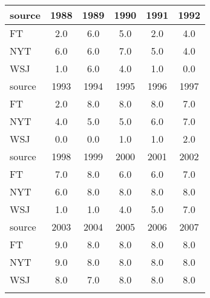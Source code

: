 \begin{tabular}{lccccc}
\hline\hline 
\addlinespace 
source & 1988 & 1989 & 1990 & 1991 & 1992 \\ 
\hline 
FT & 2.0 & 6.0 & 5.0 & 2.0 & 4.0 \\
NYT & 6.0 & 6.0 & 7.0 & 5.0 & 4.0 \\
WSJ & 1.0 & 6.0 & 4.0 & 1.0 & 0.0 \\
\hline 
\addlinespace 
source & 1993 & 1994 & 1995 & 1996 & 1997 \\ 
\hline 
FT & 2.0 & 8.0 & 8.0 & 8.0 & 7.0 \\
NYT & 4.0 & 5.0 & 5.0 & 6.0 & 7.0 \\
WSJ & 0.0 & 0.0 & 1.0 & 1.0 & 2.0 \\
\hline 
\addlinespace 
source & 1998 & 1999 & 2000 & 2001 & 2002 \\ 
\hline 
FT & 7.0 & 8.0 & 6.0 & 6.0 & 7.0 \\
NYT & 6.0 & 8.0 & 8.0 & 8.0 & 8.0 \\
WSJ & 1.0 & 1.0 & 4.0 & 5.0 & 7.0 \\
\hline 
\addlinespace 
source & 2003 & 2004 & 2005 & 2006 & 2007 \\ 
\hline 
FT & 9.0 & 8.0 & 8.0 & 8.0 & 8.0 \\
NYT & 9.0 & 8.0 & 8.0 & 8.0 & 8.0 \\
WSJ & 8.0 & 7.0 & 8.0 & 8.0 & 8.0 \\
\hline 
\addlinespace 
\end{tabular}
